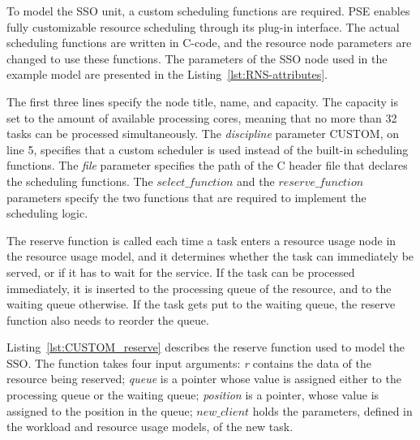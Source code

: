 To model the SSO unit, a custom scheduling functions are required. PSE enables fully customizable resource scheduling through its plug-in interface. The actual scheduling functions are written in C-code, and the resource node parameters are changed to use these functions. The parameters of the SSO node used in the example model are presented in the Listing~\ref{lst:RNS-attributes}.



The first three lines specify the node title, name, and capacity. The capacity is set to the amount of available processing cores, meaning that no more than 32 tasks can be processed simultaneously. The \emph{discipline} parameter \mbox{CUSTOM}, on line 5, specifies that a custom scheduler is used instead of the built-in scheduling functions. The \emph{file} parameter specifies the path of the C header file that declares the scheduling functions. The \emph{$select\_function$} and the \emph{$reserve\_function$} parameters specify the two functions that are required to implement the scheduling logic.

The reserve function is called each time a task enters a resource usage node in the resource usage model, and it determines whether the task can immediately be served, or if it has to wait for the service. If the task can be processed immediately, it is inserted to the processing queue of the resource, and to the waiting queue otherwise. If the task gets put to the waiting queue, the reserve function also needs to reorder the queue.

Listing~\ref{lst:CUSTOM_reserve} describes the reserve function used to model the SSO. The function takes four input arguments: \emph{r} contains the data of the resource being reserved; \emph{queue} is a pointer whose value is assigned either to the processing queue or the waiting queue; \emph{position} is a pointer, whose value is assigned to the position in the queue; \emph{$new\_client$} holds the parameters, defined in the workload and resource usage models, of the new task.



